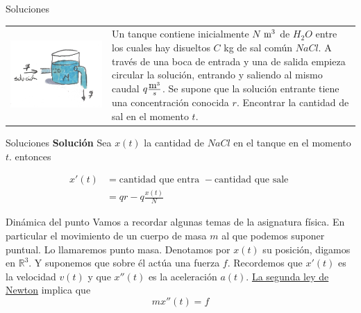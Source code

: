 \documentclass[handout,hyperref={colorlinks=true}]{beamer}
\newcommand{\rr}{\mathbb{R}}
\begin{document}
\begin{frame}{Soluciones}
\begin{tabular}{m{5cm} m{4.5cm}}
 \includegraphics[scale=.1]{imagenes/tanque.jpg} & Un tanque contiene inicialmente $N$ $\hbox{m}^3$ de $H_2O$ entre los cuales hay disueltos $C$ kg de sal común
 $NaCl$. A través de una boca de entrada y una de salida empieza circular la solución, entrando y saliendo al mismo caudal $q\frac{\hbox{m}^3}{s}$. Se supone que 
 la solución entrante tiene una concentración conocida $r$. Encontrar la cantidad de sal en el momento $t$. \\
\end{tabular}


\end{frame}


\begin{frame}{Soluciones}
\textbf{Solución} Sea $x(t)$ la cantidad de $NaCl$ en el tanque en el momento $t$. entonces

\[\begin{split}
   x'(t)&=\text{cantidad que entra }-\text{cantidad que sale }\\
          &=qr-q\frac{x(t)}{N}
  \end{split}
\]


\end{frame}

\begin{frame}{Dinámica del punto}
Vamos a recordar algunas temas de la asignatura física. En particular  el movimiento de un cuerpo de masa $m$ al que podemos suponer puntual. Lo llamaremos punto masa. Denotamos por $x(t)$ su posición, digamos en $\rr^3$. Y suponemos 
que sobre él actúa una fuerza $f$. Recordemos que $x'(t)$ es la velocidad $v(t)$ y que $x''(t)$ es la aceleración $a(t)$.  
\href{http://es.wikipedia.org/wiki/Leyes_de_Newton\#Segunda_ley_de_Newton_o_ley_de_fuerza}{La segunda ley de Newton} implica que 
\begin{equation}\label{2leyR}\boxed{mx''(t)=f}\end{equation}



\end{frame}
\end{document}
